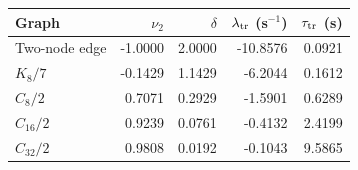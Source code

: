 \begin{tabular}{@{}lrrrr@{}}
\toprule
Graph & $\nu_2$ & $\delta$ & $\lambda_{\rm tr}$ (s$^{-1}$) & $\tau_{\rm tr}$ (s) \\
\midrule
Two-node edge & -1.0000 & 2.0000 & -10.8576 & 0.0921 \\
$K_8/7$ & -0.1429 & 1.1429 & -6.2044 & 0.1612 \\
$C_{8}/2$ & 0.7071 & 0.2929 & -1.5901 & 0.6289 \\
$C_{16}/2$ & 0.9239 & 0.0761 & -0.4132 & 2.4199 \\
$C_{32}/2$ & 0.9808 & 0.0192 & -0.1043 & 9.5865 \\
\bottomrule
\end{tabular}
